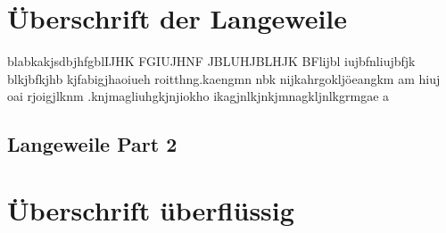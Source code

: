 \section{Überschrift der Langeweile}
blabkakjsdbjhfgblIJHK FGIUJHNF JBLUHJBLHJK BFlijbl iujbfnliujbfjk blkjbfkjhb kjfabigjhaoiueh roitthng.kaengmn nbk nijkahrgokljöeangkm am  hiuj oai rjoigjlknm .knjmagliuhgkjnjiokho ikagjnlkjnkjmnagkljnlkgrmgae a 
\subsection{Langeweile Part 2}
\section{Überschrift überflüssig}